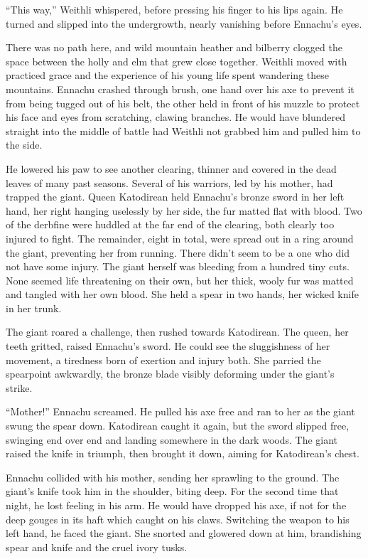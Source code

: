 ``This way,'' Weithli whispered, before pressing his finger to his lips again. He turned and slipped into the undergrowth, nearly vanishing before Ennachu's eyes.

There was no path here, and wild mountain heather and bilberry clogged the space between the holly and elm that grew close together. Weithli moved with practiced grace and the experience of his young life spent wandering these mountains. Ennachu crashed through brush, one hand over his axe to prevent it from being tugged out of his belt, the other held in front of his muzzle to protect his face and eyes from scratching, clawing branches. He would have blundered straight into the middle of battle had Weithli not grabbed him and pulled him to the side.

He lowered his paw to see another clearing, thinner and covered in the dead leaves of many past seasons. Several of his warriors, led by his mother, had trapped the giant. Queen Katodirean held Ennachu's bronze sword in her left hand, her right hanging uselessly by her side, the fur matted flat with blood. Two of the derbfine were huddled at the far end of the clearing, both clearly too injured to fight. The remainder, eight in total, were spread out in a ring around the giant, preventing her from running. There didn't seem to be a one who did not have some injury. The giant herself was bleeding from a hundred tiny cuts. None seemed life threatening on their own, but her thick, wooly fur was matted and tangled with her own blood. She held a spear in two hands, her wicked knife in her trunk.

The giant roared a challenge, then rushed towards Katodirean. The queen, her teeth gritted, raised Ennachu's sword. He could see the sluggishness of her movement, a tiredness born of exertion and injury both. She parried the spearpoint awkwardly, the bronze blade visibly deforming under the giant's strike.

``Mother!'' Ennachu screamed. He pulled his axe free and ran to her as the giant swung the spear down. Katodirean caught it again, but the sword slipped free, swinging end over end and landing somewhere in the dark woods. The giant raised the knife in triumph, then brought it down, aiming for Katodirean's chest.

Ennachu collided with his mother, sending her sprawling to the ground. The giant's knife took him in the shoulder, biting deep. For the second time that night, he lost feeling in his arm. He would have dropped his axe, if not for the deep gouges in its haft which caught on his claws. Switching the weapon to his left hand, he faced the giant. She snorted and glowered down at him, brandishing spear and knife and the cruel ivory tusks.

